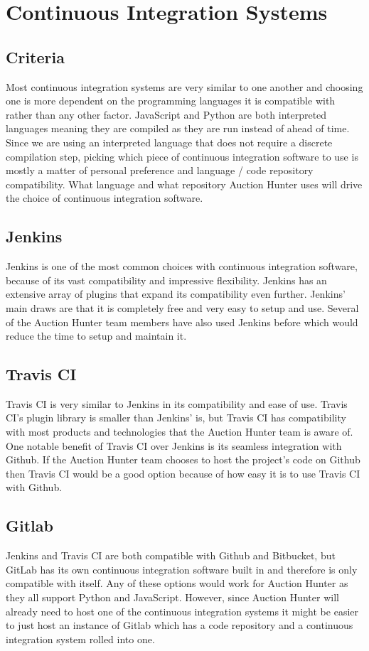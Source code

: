 \documentclass[onecolumn, draftclsnofoot,10pt, compsoc]{IEEEtran}
\begin{document}
\section{Continuous Integration Systems}
\subsection{Criteria}
Most continuous integration systems are very similar to one another and choosing one is more dependent on the programming languages it is compatible with rather than any other factor. JavaScript and Python are both interpreted languages meaning they are compiled as they are run instead of ahead of time. Since we are using an interpreted language that does not require a discrete compilation step, picking which piece of continuous integration software to use is mostly a matter of personal preference and language / code repository compatibility. What language and what repository Auction Hunter uses will drive the choice of continuous integration software. 

\subsection{Jenkins}
Jenkins is one of the most common choices with continuous integration software, because of its vast compatibility and impressive flexibility. Jenkins has an extensive array of plugins that expand its compatibility even further. Jenkins' main draws are that it is completely free and very easy to setup and use. Several of the Auction Hunter team members have also used Jenkins before which would reduce the time to setup and maintain it. 

\subsection{Travis CI}
Travis CI is very similar to Jenkins in its compatibility and ease of use. Travis CI's plugin library is smaller than Jenkins' is, but Travis CI has compatibility with most products and technologies that the Auction Hunter team is aware of. One notable benefit of Travis CI over Jenkins is its seamless integration with Github. If the Auction Hunter team chooses to host the project's code on Github then Travis CI would be a good option because of how easy it is to use Travis CI with Github. 

\subsection{Gitlab}
Jenkins and Travis CI are both compatible with Github and Bitbucket, but GitLab has its own continuous integration software built in and therefore is only compatible with itself. Any of these options would work for Auction Hunter as they all support Python and JavaScript. However, since Auction Hunter will already need to host one of the continuous integration systems it might be easier to just host an instance of Gitlab which has a code repository and a continuous integration system rolled into one.
\end{document}
